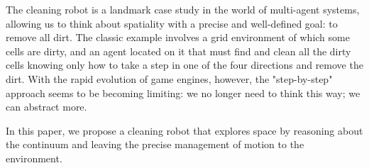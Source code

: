 \label{sec:introduction}
The cleaning robot is a landmark case study in the world of multi-agent systems, allowing us to think about spatiality with a precise and well-defined goal: to remove all dirt.
The classic example involves a grid environment of which some cells are dirty, and an agent located on it that must find and clean all the dirty cells knowing only how to take a step in one of the four directions and remove the dirt.
With the rapid evolution of game engines, however, the "step-by-step" approach seems to be becoming limiting: we no longer need to think this way; we can abstract more.

In this paper, we propose a cleaning robot that explores space by reasoning about the continuum and leaving the precise management of motion to the environment.